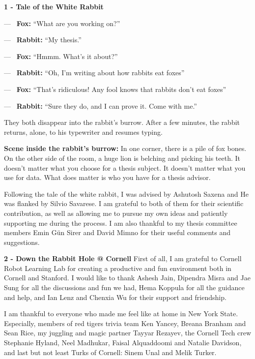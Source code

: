 
\noindent \textbf{1 - Tale of the White Rabbit \cite{tale}}

\noindent ---~ \textbf{Fox:} ``What are you working on?''

\noindent ---~ \textbf{Rabbit:} ``My thesis.''

\noindent ---~ \textbf{Fox:} ``Hmmm. What's it about?''

\noindent ---~ \textbf{Rabbit:} ``Oh, I'm writing about how rabbits eat foxes''

\noindent ---~ \textbf{Fox:} ``That's ridiculous! Any fool knows that rabbits don't eat foxes''

\noindent ---~ \textbf{Rabbit:} ``Sure they do, and I can prove it. Come with me.''

They both disappear into the rabbit's burrow. After a few minutes, the rabbit returns, alone, to his typewriter and resumes typing.

\textbf{Scene inside the rabbit's burrow:} In one corner, there is a pile of fox bones. On the other side of the room, a huge lion is belching and picking his teeth. It doesn't matter what you choose for a thesis subject. It doesn't matter what you use for data. What does matter is who you have for a thesis advisor.

Following the tale of the white rabbit, I was advised by Ashutosh Saxena and He was flanked by Silvio Savarese. I am grateful to both of them for their scientific contribution, as well as allowing me to pursue my own ideas and patiently supporting me during the process. I am also thankful to my thesis committee members Emin G\"{u}n Sirer and David Mimno for their useful comments and suggestions. 

\noindent \textbf{2 - Down the Rabbit Hole @ Cornell}
First of all, I am grateful to Cornell Robot Learning Lab for creating a productive and fun environment both in Cornell and Stanford. I would like to thank Ashesh Jain, Dipendra Misra and Jae Sung for all the discussions and fun we had, Hema Koppula for all the guidance and help, and Ian Lenz and Chenxia Wu for their support and friendship.

I am thankful to everyone who made me feel like at home in New York State. Especially, members of red tigers trivia team Ken Yancey, Breana Branham and Sean Rice, my juggling and magic partner Tayyar Rezayev, the Cornell Tech crew Stephanie Hyland, Neel Madhukar, Faisal Alquaddoomi and Natalie Davidson, and last but not least Turks of Cornell: Sinem Unal and Melik Turker.

